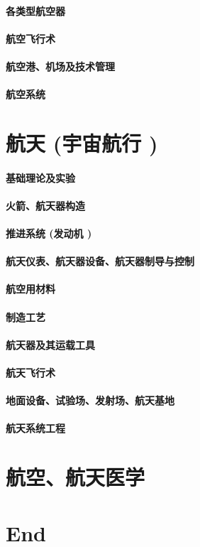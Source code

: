 \documentclass[UTF8]{../ApplicationUniverse}
\begin{document}
\subsubsection{各类型航空器}
\subsubsection{航空飞行术}
\subsubsection{航空港、机场及技术管理}
\subsubsection{航空系统}




\chapter{航天 (宇宙航行 )}
\subsubsection{基础理论及实验}
\subsubsection{火箭、航天器构造}
\subsubsection{推进系统 (发动机 )}
\subsubsection{航天仪表、航天器设备、航天器制导与控制}
\subsubsection{航空用材料}
\subsubsection{制造工艺}
\subsubsection{航天器及其运载工具}
\subsubsection{航天飞行术}
\subsubsection{地面设备、试验场、发射场、航天基地}
\subsubsection{航天系统工程}



\chapter{航空、航天医学}





\chapter{End}
\end{document}
